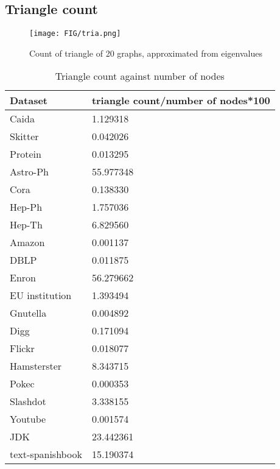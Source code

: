 \subsection{Triangle count}
\begin{figure}[H]
\begin{center}
\texttt{[image: FIG/tria.png]}
\caption{Count of triangle of 20 graphs, approximated from eigenvalues}
\end{center}
\end{figure}

\begin{table}[H]
\fontsize{8}{10}\selectfont
\begin{center}
\begin{tabular}{ll}
Dataset          & triangle count/number of nodes*100 \\ \hline
Caida            & 1.129318                    \\
Skitter          & 0.042026                    \\
Protein          & 0.013295                    \\
Astro-Ph         & 55.977348                   \\
Cora             & 0.138330                    \\
Hep-Ph           & 1.757036                    \\
Hep-Th           & 6.829560                    \\
Amazon           & 0.001137                    \\
DBLP             & 0.011875                    \\
Enron            & 56.279662                   \\
EU institution   & 1.393494                    \\
Gnutella         & 0.004892                    \\
Digg             & 0.171094                    \\
Flickr           & 0.018077                    \\
Hamsterster      & 8.343715                    \\
Pokec            & 0.000353                    \\
Slashdot         & 3.338155                    \\
Youtube          & 0.001574                    \\
JDK              & 23.442361                   \\
text-spanishbook & 15.190374                   \\ \hline
\end{tabular}
\caption{Triangle count against number of nodes}
\end{center}
\end{table}

